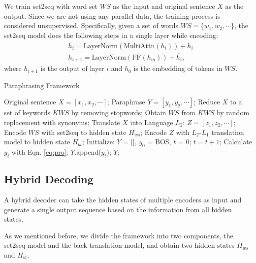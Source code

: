 We train set2seq with word set $WS$ as the input and original sentence 
$X$ as the output. Since we are not using any parallel data, the training process is considered unsupervised.  Specifically, given a set of words $WS = \{w_1, w_2,\cdots\}$, the set2seq model does the following steps in a single layer while encoding:
\begin{align}
& \overline{h_{i}} = \text{LayerNorm}(\text{MultiAttn}(h_{i})) + h_{i} \\
& h_{i+1} = \text{LayerNorm}(\text{FF}(h_{m})) + \overline{h_{i}},
\end{align}
where $h_{i+1}$ is the output of layer $i$ and $h_0$ is the embedding of tokens in $WS$.

\begin{algorithm}[t]
\caption{Paraphrasing Framework} 
\label{alg:jd}
\begin{algorithmic}[1]
\REQUIRE Original sentence $X = [x_1, x_2, \cdots]$;
\ENSURE Paraphrase $Y = [y_1, y_2, \cdots]$;
\STATE Reduce $X$ to a set of keywords $KWS$ by removing stopwords;
\STATE Obtain $WS$ from $KWS$ by random replacement with synonyms;
\STATE Translate $X$ into Language $L_2$: $Z = [z_1,z_2,\cdots]$;
\STATE Encode $WS$ with set2seq to hidden state $H_{ws}$;
\STATE Encode $Z$ with $L_2$-$L_1$ translation model to hidden state $H_{bt}$;
\STATE Initialize: $Y$ = [], $y_0$ = BOS, $t$ = 0;
\STATE $t = t + 1$;
\STATE Calculate $y_t$ with Eqn. \ref{eq:pro};
\STATE $Y$.append($y_t$);
\ENDWHILE
\RETURN $Y$;
\end{algorithmic}
\end{algorithm}


\subsection{Hybrid Decoding}\label{sec:joint}
A hybrid decoder can take the hidden states of multiple encoders as input and generate a single output sequence based on the information from all hidden states.

As we mentioned before, we divide the framework into two components, the set2seq model and the back-translation model, and obtain two hidden states $H_{ws}$ and $H_{bt}$. 

